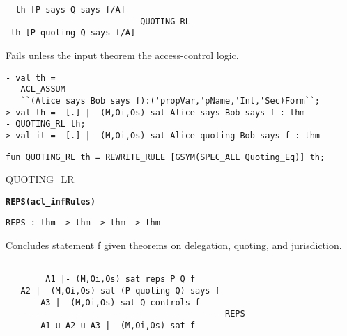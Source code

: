 \DESCRIBE
\begin{verbatim}
  th [P says Q says f/A]
 ------------------------- QUOTING_RL
 th [P quoting Q says f/A]
\end{verbatim}

\FAILURE
Fails unless the input theorem 
the access-control logic.

\EXAMPLE
\begin{holboxed}
\begin{verbatim}
- val th = 
   ACL_ASSUM 
   ``(Alice says Bob says f):('propVar,'pName,'Int,'Sec)Form``;
> val th =  [.] |- (M,Oi,Os) sat Alice says Bob says f : thm
- QUOTING_RL th;
> val it =  [.] |- (M,Oi,Os) sat Alice quoting Bob says f : thm
\end{verbatim}
\end{holboxed}

\IMPLEMENTATION
\begin{holboxed}
\begin{verbatim}
fun QUOTING_RL th = REWRITE_RULE [GSYM(SPEC_ALL Quoting_Eq)] th;
\end{verbatim}
\end{holboxed}

\SEEALSO
QUOTING\_LR
\ENDDOC

\begin{holboxed}
  \begin{Large}
    \textbf{\texttt{REPS}}\hfill{}\textbf{\texttt{(acl\_infRules)}}
  \end{Large}
\end{holboxed}

\begin{verbatim}
REPS : thm -> thm -> thm -> thm
\end{verbatim}

\SYNOPSIS
Concludes statement f given theorems on delegation, quoting, and 
jurisdiction.

\DESCRIBE
\begin{verbatim}

        A1 |- (M,Oi,Os) sat reps P Q f  
   A2 |- (M,Oi,Os) sat (P quoting Q) says f
       A3 |- (M,Oi,Os) sat Q controls f
   ---------------------------------------- REPS
       A1 u A2 u A3 |- (M,Oi,Os) sat f
\end{verbatim}

